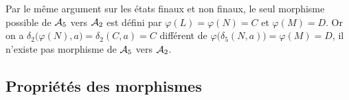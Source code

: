 \begin{Exercise}
Par le même argument sur les états finaux et non finaux, le seul morphisme possible de ${\cal A}_5$ vers ${\cal A}_2$ est défini par $\varphi(L)=\varphi(N)=C$ et  $\varphi(M)=D$. Or on a $\delta_2\bigl(\varphi(N), a\bigr)= \delta_2(C, a)= C $ différent de $\varphi\bigl(\delta_5(N, a)\bigr) = \varphi(M)=D$, il n'existe pas morphisme de ${\cal A}_5$ vers ${\cal A}_2$.
\end{Exercise}
\subsection{Propriétés des morphismes}
